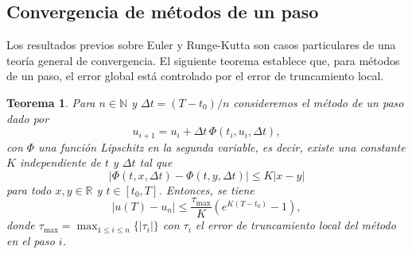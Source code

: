 \documentclass[a4paper,11pt]{report}
\newtheorem{theorem}{Teorema}[chapter]
\begin{document}
\subsection{Convergencia de métodos de un paso}

Los resultados previos sobre Euler y Runge-Kutta son casos particulares de una teoría general de convergencia. El siguiente teorema establece que, para métodos de un paso, el error global está controlado por el error de truncamiento local.

\begin{theorem}
Para $n \in \mathbb{N}$ y $\Delta t = (T-t_0)/n$ consideremos el método de un paso dado por
\[
u_{i+1} = u_i + \Delta t\,\Phi(t_i, u_i, \Delta t),
\]
con $\Phi$ una función Lipschitz en la segunda variable, es decir, existe una constante $K$ independiente de $t$ y $\Delta t$ tal que
\[
|\Phi(t,x,\Delta t) - \Phi(t,y,\Delta t)| \leq K|x-y|
\]
para todo $x,y \in \mathbb{R}$ y $t \in [t_0, T]$. Entonces, se tiene
\[
|u(T) - u_n| \leq \frac{\tau_{\max}}{K}\left(e^{K(T-t_0)} - 1\right),
\]
donde $\tau_{\max} = \max_{1 \leq i \leq n}\{|\tau_i|\}$ con $\tau_i$ el error de truncamiento local del método en el paso $i$.
\end{theorem}
\end{document}
